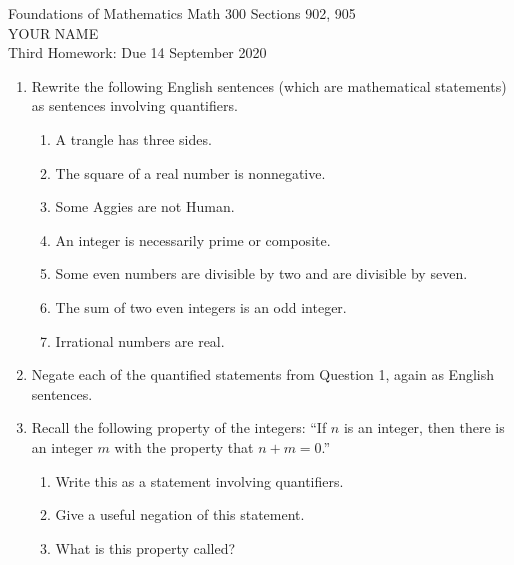 \documentclass[12pt]{article}
\begin{document}
\LARGE 
\noindent
{\color{Maroon}Foundations of Mathematics \hfill Math 300 Sections 902, 905}\vspace{2pt}\\
\Large YOUR NAME\vspace{2pt}\\
\large
Third Homework: \hfill Due 14 September 2020
\normalsize    %
\vspace{10pt}  %


\begin{enumerate}

 
\item Rewrite the following English sentences (which are  mathematical statements) as sentences involving quantifiers.
 \begin{enumerate}
   \item A trangle has three sides.
   \item The square of a real number is nonnegative.
   \item Some Aggies are not Human.
   \item An integer is necessarily prime or composite.
   \item Some even numbers are divisible by two and are divisible by seven.
   \item The sum of two even integers is an odd integer.
   \item Irrational numbers are real.
 \end{enumerate}

\item Negate each of the quantified statements from Question 1, again as English sentences.

\item Recall the following property of the integers:\newline
      ``If $n$ is an integer, then there is an integer $m$ with the property that $n+m=0$.''
 \begin{enumerate}
   \item Write this as a statement involving quantifiers.
   \item Give a useful negation of this statement.
   \item What is this property called?
 \end{enumerate}


\end{enumerate}
\end{document}
